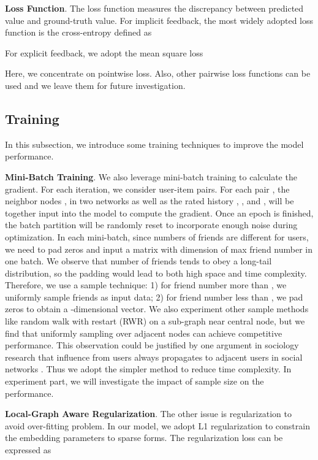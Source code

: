\documentclass[sigconf]{acmart}
\begin{document}
\textbf{Loss Function}. The loss function measures the discrepancy between predicted value and ground-truth value. For implicit feedback, the most widely adopted loss function is the cross-entropy defined as

For explicit feedback, we adopt the mean square loss

Here, we concentrate on pointwise loss. Also, other pairwise loss functions can be used and we leave them for future investigation.

\subsection{Training}
In this subsection, we introduce some training techniques to improve the model performance.

\textbf{Mini-Batch Training}. We also leverage mini-batch training to calculate the gradient. For each iteration, we consider  user-item pairs. For each pair , the neighbor nodes ,  in two networks as well as the rated history , , and ,  will be together input into the model to compute the gradient. Once an epoch is finished, the batch partition will be randomly reset to incorporate enough noise during optimization. In each mini-batch, since numbers of friends are different for users, we need to pad zeros and input a matrix with dimension of max friend number in one batch. We observe that number of friends tends to obey a long-tail distribution, so the padding would lead to both high space and time complexity. Therefore, we use a sample technique: 1) for friend number more than , we uniformly sample  friends as input data; 2) for friend number less than , we pad zeros to obtain a -dimensional vector. We also experiment other sample methods like random walk with restart (RWR) \cite{RWR} on a sub-graph near central node, but we find that uniformly sampling over adjacent nodes can achieve competitive performance. This observation could be justified by one argument in sociology research that influence from users always propagates to adjacent users in social networks \cite{WSDM}. Thus we adopt the simpler method to reduce time complexity. In experiment part, we will investigate the impact of sample size  on the performance.

\textbf{Local-Graph Aware Regularization}. The other issue is regularization to avoid over-fitting problem. In our model, we adopt L1 regularization to constrain the embedding parameters to sparse forms. The regularization loss can be expressed as
\end{document}
